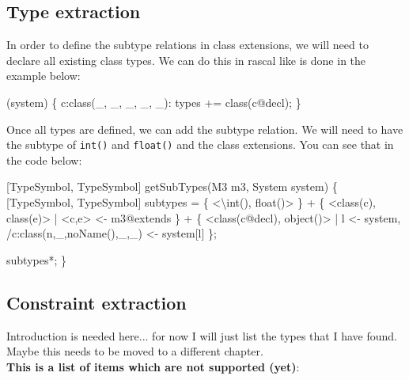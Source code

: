 \documentclass[../main.tex]{subfiles}
\begin{document}
    \subsection{Type extraction}
    In order to define the subtype relations in class extensions, we will need to declare all existing class types.
    We can do this in rascal like is done in the example below:
    \begin{rascal}
 (system) \{{}
     c:class(\_{}, \_{}, \_{}, \_{}, \_{}): types += class(c@decl);
\}{}
    \end{rascal}
    Once all types are defined, we can add the subtype relation. We will need to have the subtype of \texttt{int()} and \texttt{float()} and the class extensions.
    You can see that in the code below:
    \begin{rascal}
 [TypeSymbol, TypeSymbol] getSubTypes(M3 m3, System system) 
\{{}
    [TypeSymbol, TypeSymbol] subtypes
        = \{{} \textless{}\textbackslash{}int(), float()\textgreater{} \}{} 
        + \{{} \textless{}class(c), class(e)\textgreater{} | \textless{}c,e\textgreater{} \textless{}- m3@extends \}{}
        + \{{} \textless{}class(c@decl), object()\textgreater{} | l \textless{}- system, /c:class(n,\_{},noName(),\_{},\_{}) \textless{}- system{}[l] \}{};
        
     subtypes*;        
\}{}
    \end{rascal}
  
    \subsection{Constraint extraction}
       
    Introduction is needed here... for now I will just list the types that I have found.
    Maybe this needs to be moved to a different chapter.
    \\
    \textbf{This is a list of items which are not supported (yet)}:
\end{document}
